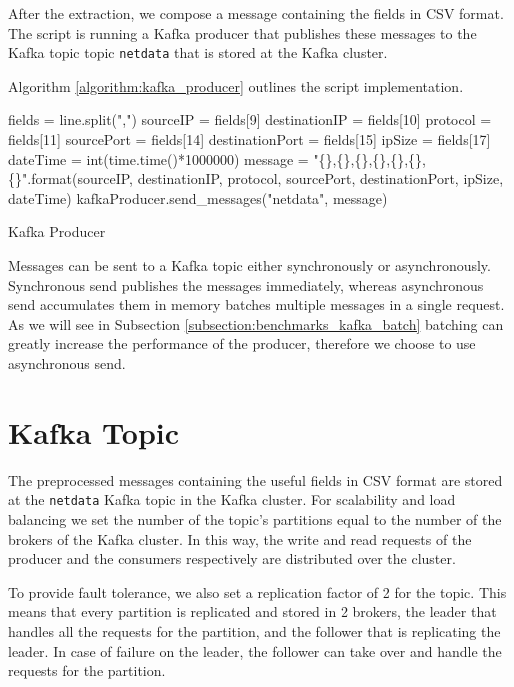 After the extraction, we compose a message containing the fields in CSV format. The script is running a Kafka producer that publishes these messages to the Kafka topic topic \texttt{netdata} that is stored at the Kafka cluster. 

Algorithm \ref{algorithm:kafka_producer} outlines the script implementation.

\begin{algorithm}[H]
\begin{algorithmic}[1]
\State fields = line.split(",")
\State sourceIP = fields[9]
\State destinationIP = fields[10]
\State protocol = fields[11]
\State sourcePort = fields[14]
\State destinationPort = fields[15]
\State ipSize = fields[17]
\State dateTime = int(time.time()*1000000)
\State message = "\{\},\{\},\{\},\{\},\{\},\{\},\{\}".format(sourceIP, destinationIP, protocol, sourcePort, destinationPort, ipSize, dateTime)
\State kafkaProducer.send\_messages("netdata", message)
\EndFor
\end{algorithmic}
\caption{Kafka Producer}
\label{algorithm:kafka_producer}
\end{algorithm}

Messages can be sent to a Kafka topic either synchronously or asynchronously. Synchronous send publishes the messages immediately, whereas asynchronous send accumulates them in memory batches  multiple messages in a single request. As we will see in Subsection \ref{subsection:benchmarks_kafka_batch} batching can greatly increase the performance of the producer, therefore we choose to use asynchronous send.


\section{Kafka Topic}

The preprocessed messages containing the useful fields in CSV format are stored at the \texttt{netdata} Kafka topic in the Kafka cluster. For scalability and load balancing we set the number of the topic's partitions equal to the number of the brokers of the Kafka cluster. In this way, the write and read requests of the producer and the consumers respectively are distributed over the cluster.

To provide fault tolerance, we also set a replication factor of 2 for the topic. This means that every partition is replicated and stored in 2 brokers, the leader that handles all the requests for the partition, and the follower that is replicating the leader. In case of failure on the leader, the follower can take over and handle the requests for the partition.

